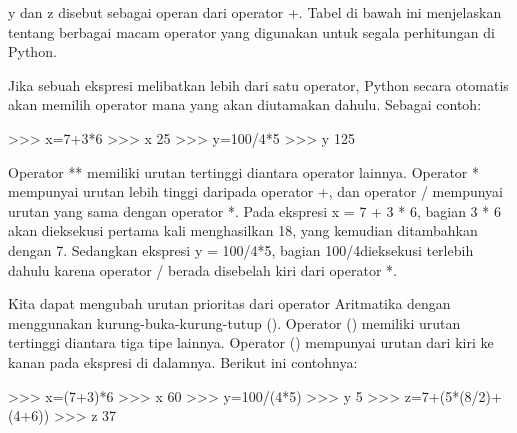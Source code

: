 \noindent 
y $  $dan $  $z $  $disebut sebagai operan dari operator $  $+. Tabel di bawah ini menjelaskan tentang berbagai macam operator yang digunakan untuk segala perhitungan di Python. \par
\vspace{12pt}
\noindent 
Jika sebuah ekspresi melibatkan lebih dari satu operator, Python secara otomatis akan memilih operator mana yang akan diutamakan dahulu. Sebagai contoh: \par
\noindent 
>>> x=7+3*6\vspace{\baselineskip}
>>> x\vspace{\baselineskip}
25\vspace{\baselineskip}
>>> y=100/4*5\vspace{\baselineskip}
>>> y\vspace{\baselineskip}
125 \par
\vspace{12pt}
\noindent 
Operator $  $** $  $memiliki urutan tertinggi diantara operator lainnya. Operator $  $* $  $mempunyai urutan lebih tinggi daripada operator $  $+, dan operator $  $/ $  $mempunyai urutan yang sama dengan operator $  $*. Pada ekspresi $  $x = 7 + 3 * 6, bagian $  $3 * 6 $  $akan dieksekusi pertama kali menghasilkan $  $18, yang kemudian ditambahkan dengan $  $7. Sedangkan ekspresi $  $y = 100/4*5, bagian $  $100/4dieksekusi terlebih dahulu karena operator $  $/ $  $berada disebelah kiri dari operator $  $*. \par
\vspace{12pt}
\noindent 
Kita dapat mengubah urutan prioritas dari operator Aritmatika dengan menggunakan kurung-buka-kurung-tutup $  $(). Operator $  $() $  $memiliki urutan tertinggi diantara tiga tipe lainnya. Operator $  $() $  $mempunyai urutan dari kiri ke kanan pada ekspresi di dalamnya. Berikut ini contohnya: \par
\vspace{12pt}
\noindent 
>>> x=(7+3)*6\vspace{\baselineskip}
>>> x\vspace{\baselineskip}
60\vspace{\baselineskip}
>>> y=100/(4*5)\vspace{\baselineskip}
>>> y\vspace{\baselineskip}
5\vspace{\baselineskip}
>>> z=7+(5*(8/2)+(4+6))\vspace{\baselineskip}
>>> z\vspace{\baselineskip}
37 \par
